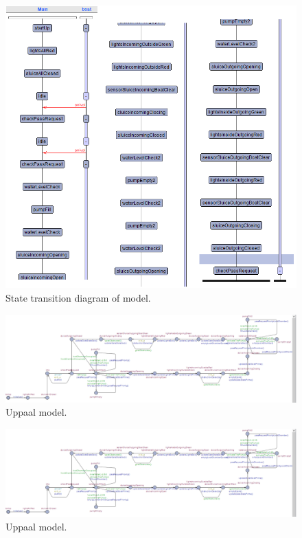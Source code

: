 \documentclass{article}
\begin{document}
\begin{figure}[!h]
	\centering
	\includegraphics[width=\textwidth]{images/State_diagram2.png}
    \caption{State transition diagram of model.}
\end{figure}
\newpage
\begin{figure}[!h]
	\centering
	\includegraphics[width=\textwidth]{images/Uppaal_model.png}
    \caption{Uppaal model.}
    \label{fig:uppaalmodel}
\end{figure}
\newpage
\begin{figure}
	\centering
	\includegraphics[width=\textwidth]{images/Uppaal_model.png}
    \caption{Uppaal model.}
    \label{fig:uppaalmodelsideways}
\end{figure}
\clearpage
\newpage



\end{document}

